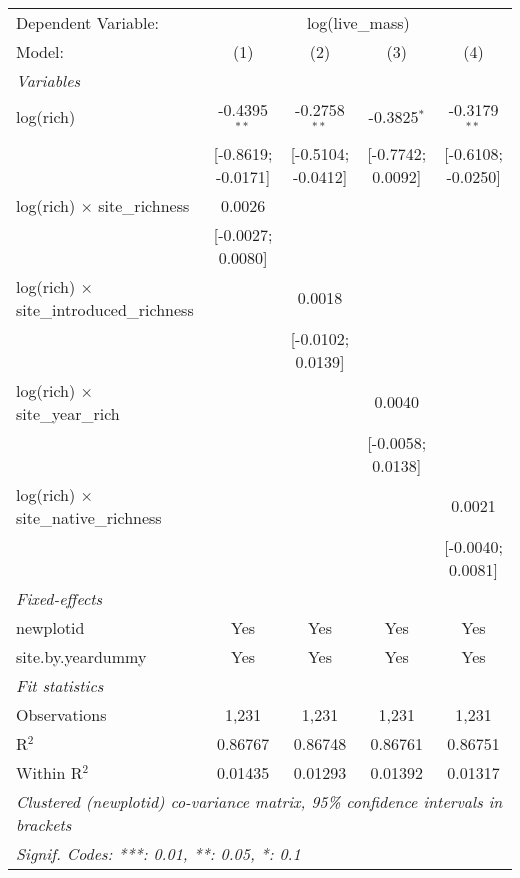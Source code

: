 \begin{tabular}{lcccc}
\tabularnewline\midrule\midrule
Dependent Variable:&\multicolumn{4}{c}{log(live\_mass)}\\
Model:&(1) & (2) & (3) & (4)\\
\midrule \emph{Variables}&   &   &   &  \\
log(rich) & -0.4395$^{**}$ & -0.2758$^{**}$ & -0.3825$^{*}$ & -0.3179$^{**}$\\
  &[-0.8619; -0.0171] & [-0.5104; -0.0412] & [-0.7742; 0.0092] & [-0.6108; -0.0250]\\
log(rich) $\times $ site\_richness & 0.0026 &    &    &   \\
  &[-0.0027; 0.0080] &    &    &   \\
log(rich) $\times $ site\_introduced\_richness &    & 0.0018 &    &   \\
  &   & [-0.0102; 0.0139] &    &   \\
log(rich) $\times $ site\_year\_rich &    &    & 0.0040 &   \\
  &   &    & [-0.0058; 0.0138] &   \\
log(rich) $\times $ site\_native\_richness &    &    &    & 0.0021\\
  &   &    &    & [-0.0040; 0.0081]\\
\midrule \emph{Fixed-effects}&   &   &   &  \\
newplotid & Yes & Yes & Yes & Yes\\
site.by.yeardummy & Yes & Yes & Yes & Yes\\
\midrule \emph{Fit statistics}&  & & & \\
Observations & 1,231&1,231&1,231&1,231\\
R$^2$ & 0.86767&0.86748&0.86761&0.86751\\
Within R$^2$ & 0.01435&0.01293&0.01392&0.01317\\
\midrule\midrule\multicolumn{5}{l}{\emph{Clustered (newplotid) co-variance matrix, 95\% confidence intervals in brackets}}\\
\multicolumn{5}{l}{\emph{Signif. Codes: ***: 0.01, **: 0.05, *: 0.1}}\\
\end{tabular}


